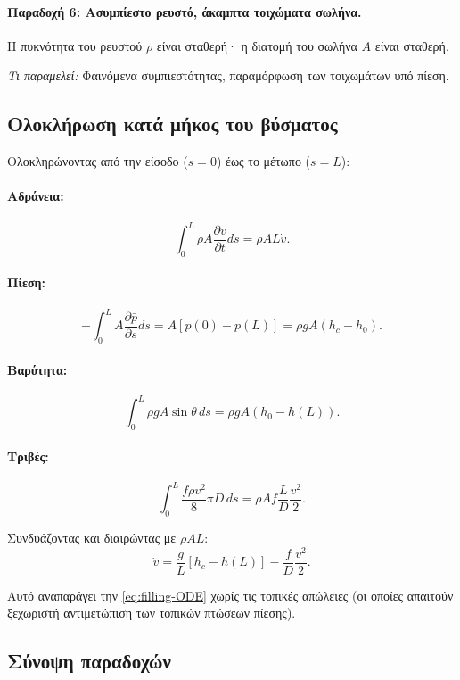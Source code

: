 \documentclass[11pt]{article}
\begin{document}
\paragraph{Παραδοχή 6: Ασυμπίεστο ρευστό, άκαμπτα τοιχώματα σωλήνα.}
Η πυκνότητα του ρευστού $\rho$ είναι σταθερή· η διατομή του σωλήνα $A$ είναι σταθερή.

\emph{Τι παραμελεί:} Φαινόμενα συμπιεστότητας, παραμόρφωση των τοιχωμάτων υπό πίεση.

\subsection{Ολοκλήρωση κατά μήκος του βύσματος}

Ολοκληρώνοντας από την είσοδο ($s = 0$) έως το μέτωπο ($s = L$):

\paragraph{Αδράνεια:}
\[
  \int_0^L \rho A \frac{\partial v}{\partial t} ds = \rho A L \dot{v}.
\]

\paragraph{Πίεση:}
\[
  -\int_0^L A \frac{\partial \bar{p}}{\partial s} ds = A[p(0) - p(L)] = \rho g A(h_c - h_0).
\]

\paragraph{Βαρύτητα:}
\[
  \int_0^L \rho g A \sin\theta \, ds = \rho g A(h_0 - h(L)).
\]

\paragraph{Τριβές:}
\[
  \int_0^L \frac{f\rho v^2}{8}\pi D \, ds = \rho A f \frac{L}{D}\frac{v^2}{2}.
\]

Συνδυάζοντας και διαιρώντας με $\rho A L$:
\[
  \dot{v} = \frac{g}{L}[h_c - h(L)] - \frac{f}{D}\frac{v^2}{2}.
\]

Αυτό αναπαράγει την \eqref{eq:filling-ODE} χωρίς τις τοπικές απώλειες (οι οποίες απαιτούν ξεχωριστή αντιμετώπιση των τοπικών πτώσεων πίεσης).

\subsection{Σύνοψη παραδοχών}
\end{document}
